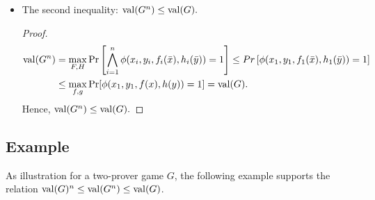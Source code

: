 \begin{itemize}
\begin{proof}
The couple $(f,h)$ is the optimal couple of strategies for the game $G$, this does not means that the couple $(F,H)$  is the optimal couple of the strategies for the parallel repetition $G^n$. Then, the winning probability for $G^n$ over the optimal couple of strategies is:
\begin{align*}
\val (G^n)= & \max\limits_{F,H} \Pr \left[\bigwedge\limits_{i=1}^n \phi (x_i,y_i, f_i(\bar{x}), h_i(\bar{y}))=1 \right] 
 \geq  \Pr \left[\bigwedge\limits_{i=1}^n \phi (x_i,y_i, f_i(\bar{x}), h_i(\bar{y}))=1 \right] \\
 = & \prod\limits_{i=1}^n \Pr \left[ \phi (x_i,y_i, f(\bar{x}), h(\bar{y}))=1 \right]  =  \prod\limits_{i=1}^n \val (G)  =  \val (G)^n .
\end{align*}

Hence, $\val (G^n) \geq \val (G)^n.$
\end{proof}

\item The second inequality: $\mathrm{val} (G^n) \leq \mathrm{val} (G).$
\begin{proof}
 \begin{align*}
 \mathrm{val} (G^n) & = \max\limits_{F,H} \Pr \left[\bigwedge\limits_{i=1}^n \phi (x_i,y_i, f_i(\bar{x}), h_i(\bar{y}))=1 \right] \leq Pr \left[ \phi (x_1,y_1, f_1(\bar{x}), h_1(\bar{y}))=1 \right] \\
 &  \leq \max\limits_{f,g} \Pr[\phi(x_1,y_1,f(x),h(y))=1]  = \mathrm{val} (G).
 \end{align*}
Hence, $\mathrm{val} (G^n) \leq \mathrm{val} (G).$
\end{proof}
\end{itemize}

\subsection{Example}
As illustration for a two-prover game $G$, the following example supports the relation  $\mathrm{val} (G)^n \leq \mathrm{val} (G^n) \leq \mathrm{val} (G)$.

